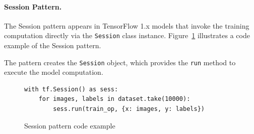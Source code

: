 \paragraph{Session Pattern.} 
The Session pattern appears in TensorFlow 1.x models that invoke the training
computation directly via the {\tt Session} class instance.
Figure~\ref{fig:sessionpattern} illustrates a code example of the Session
pattern. 
\begin{inred}
The pattern creates the {\tt Session} object,
which provides the {\tt run} method to execute the model computation.
\end{inred}

\begin{figure}[!ht]
\begin{lstlisting}[style=mpython]
with tf.Session() as sess:
    for images, labels in dataset.take(10000):
        sess.run(train_op, {x: images, y: labels})
\end{lstlisting}
\caption{Session pattern code example}
\label{fig:sessionpattern}
\end{figure}




